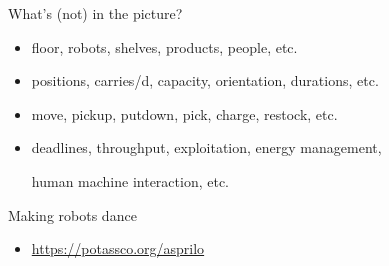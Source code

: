 \begin{frame}{What's (not) in the picture?}
  \bigskip
  \begin{itemize}
  \item {}

    floor,
    robots,
    shelves,
    products,
    people,
    etc.
    \medskip
  \item {}

    positions,
    carries/d,
    capacity,
    orientation,
    durations,
    etc.
    \medskip
  \item {}

    move,
    pickup,
    putdown,
    pick,
    charge,
    restock,
    etc.
    \medskip
  \item {}

    deadlines,
    throughput,
    exploitation,
    energy management,\par
    human machine interaction,
    etc.
  \end{itemize}
  \bigskip
\end{frame}
\begin{frame}[c]{Making robots dance}
  \begin{center}%
  \end{center}
  \begin{itemize}
  \item {} \url{https://potassco.org/asprilo}
  \end{itemize}
\end{frame}
%
